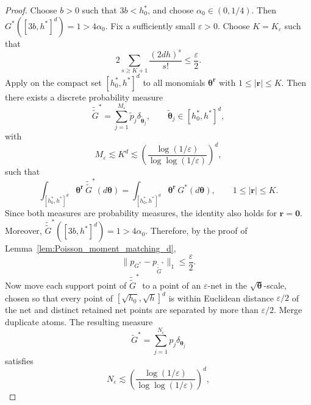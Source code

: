 \documentclass[twoside,12pt]{article}
\begin{document}
\begin{proof}
Choose $b>0$ such that $3b<h_0^\ast$, and choose $\alpha_0\in(0,1/4)$. Then $G^\ast([3b,h^\ast]^d)=1>4\alpha_0$. Fix a sufficiently small $\varepsilon>0$. Choose $K=K_\varepsilon$ such that
\begin{displaymath}
2\sum_{s\geq K+1}\frac{(2dh)^s}{s!}\le\frac{\varepsilon}{2}.
\end{displaymath}
Apply \citet[Lemma A.1]{Gho(01)} on the compact set $[h_0^\ast,h^\ast]^d$ to all monomials $\boldsymbol\theta^{\boldsymbol r}$ with $1\le |\boldsymbol r|\le K$. Then there exists a discrete probability measure
\begin{displaymath}
\tilde{\tilde G}^\ast=\sum_{j=1}^{M_\varepsilon}\widetilde p_j\delta_{\widetilde{\boldsymbol\theta}_j},\qquad\widetilde{\boldsymbol\theta}_j\in[h_0^\ast,h^\ast]^d,
\end{displaymath}
with
\begin{displaymath}
M_\varepsilon\lesssim K^d\lesssim\left(\frac{\log(1/\varepsilon)}{\log\log(1/\varepsilon)}\right)^d,
\end{displaymath}
such that
\begin{displaymath}
\int_{[h_0^\ast,h^\ast]^d}\boldsymbol\theta^{\boldsymbol r}\,\tilde{\tilde G}^\ast(d\boldsymbol\theta)=\int_{[h_0^\ast,h^\ast]^d}\boldsymbol\theta^{\boldsymbol r}\,
G^\ast(d\boldsymbol\theta),\qquad 1\le |\boldsymbol r|\le K.
\end{displaymath}
Since both measures are probability measures, the identity also holds for $\boldsymbol r=\boldsymbol 0$. Moreover, $\tilde{\tilde G}^\ast([3b,h^\ast]^d)=1>4\alpha_0$. Therefore, by the proof of Lemma~\ref{lem:Poisson_moment_matching_d},
\begin{displaymath}
\|p_{G^\ast}-p_{\tilde{\tilde G}^\ast}\|_1\le\frac{\varepsilon}{2}.
\end{displaymath}
Now move each support point of $\tilde{\tilde G}^\ast$ to a point of an $\varepsilon$-net in the $\sqrt{\boldsymbol\theta}$-scale, chosen so that every point of $[\sqrt{h_{0}},\sqrt h]^d$ is within Euclidean distance $\varepsilon/2$ of the net and distinct retained net points are separated by more than $\varepsilon/2$. Merge duplicate atoms. The resulting
measure
\begin{displaymath}
\tilde G^\ast=\sum_{j=1}^{N_\varepsilon}p_j\delta_{\boldsymbol\theta_j}
\end{displaymath}
satisfies
\begin{displaymath}
N_\varepsilon\lesssim\left(\frac{\log(1/\varepsilon)}{\log\log(1/\varepsilon)}\right)^d,

\end{displaymath}
\end{proof}
\end{document}
